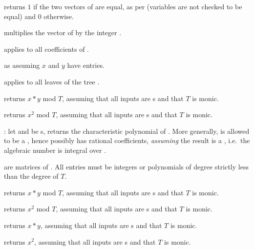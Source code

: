 
 returns $1$ if the two vectors of 
are equal, as per  (variables are not checked to be equal) and
$0$ otherwise.

 multiplies the vector of  
by the integer .

 applies  to all
coefficients of .

 as  assuming $x$
and $y$ have  entries.


 applies  to all
leaves of the tree .


 returns $x*y$ mod $T$, assuming
that all inputs are s and that $T$ is monic.

 returns $x^2$ mod $T$, assuming
that all inputs are s and that $T$ is monic.

: let  and  be
s, returns the characteristic polynomial of .
More generally,  is allowed to be a , hence possibly has
rational coefficients, \emph{assuming} the result is a , i.e.~the
algebraic number  is integral over .


 are matrices of . All entries must be integers or
polynomials of degree strictly less than the degree of $T$.

 returns $x*y$ mod $T$, assuming
that all inputs are s and that $T$ is monic.

 returns $x^2$ mod $T$, assuming
that all inputs are s and that $T$ is monic.


 returns $x*y$, assuming
that all inputs are s and that $T$ is monic.

 returns $x^2$, assuming
that all inputs are s and that $T$ is monic.


